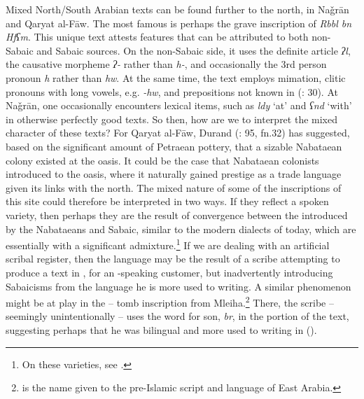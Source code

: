 \documentclass[output=paper]{langsci/langscibook}
\begin{document}
Mixed North/South Arabian texts can be found further to the north, in Naǧrān and Qaryat al-Fāw. The most famous is perhaps the grave inscription of \textit{Rbbl bn Hfʕm}. This unique text attests features that can be attributed to both non-Sabaic and Sabaic sources. On the non-Sabaic side, it uses the {definite} {article} \textit{ʔl}, the {causative} morpheme \textit{ʔ-} rather than \textit{h-}, and occasionally the 3rd person pronoun \textit{h} rather than \textit{hw}. At the same time, the text employs mimation, {clitic} pronouns with long vowels, e.g. \textit{-hw}, and {prepositions} not known in  (\citealt{Al-Jallad2018ANA}: 30). At Naǧrān, one occasionally encounters  lexical items, such as \textit{ldy} ‘at’ and \textit{ʕnd} ‘with’ in otherwise perfectly good  texts. So then, how are we to interpret the mixed character of these texts? For Qaryat al-Fāw, Durand (\citeyear{Durand2017}: 95, fn.32) has suggested, based on the significant amount of Petraean pottery, that a sizable Nabataean colony existed at the oasis. It could be the case that Nabataean colonists introduced  to the oasis, where it naturally gained {prestige} as a trade language given its links with the north. The mixed nature of some of the inscriptions of this site could therefore be interpreted in two ways. If they reflect a spoken variety, then perhaps they are the result of {convergence} between the  introduced by the Nabataeans and Sabaic, similar to the modern dialects of   today, which are essentially  with a significant  admixture.\footnote{On these varieties, see \citet{Watson2018}.} If we are dealing with an artificial scribal {register}, then the language may be the result of a scribe attempting to produce a text in , for an -speaking customer, but inadvertently introducing Sabaicisms from the language he is more used to writing. A similar phenomenon might be at play in the – tomb inscription from Mleiha.\footnote{ is the name given to the pre-Islamic script and language of East Arabia.} There, the scribe – seemingly unintentionally – uses the  word for son, \textit{br}, in the  portion of the text, suggesting perhaps that he was bilingual and more used to writing in  (\citealt{Overlaetetal2016}).
\end{document}
